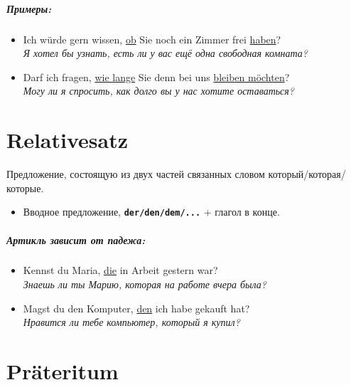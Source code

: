 \documentclass[12pt,a4paper]{report}
\newcommand{\term}[1]{\texttt{\textbf{#1}}}
\newcommand{\satzew}[1]{\underline{#1}}
\newcommand{\ubersatze}[1]{\textit{#1}}
\begin{document}
\paragraph{Примеры:}
\begin{itemize}
 \item Ich würde gern wissen, \satzew{ob} Sie noch ein Zimmer frei \satzew{haben}? 
 ~\\ \ubersatze{Я хотел бы узнать, есть ли у вас ещё одна свободная комната?}
 \item Darf ich fragen, \satzew{wie lange} Sie denn bei uns \satzew{bleiben möchten}? 
 ~\\ \ubersatze{Могу ли я спросить, как долго вы у нас хотите оставаться?}
\end{itemize}


\newpage

\chapter{Relativesatz}

Предложение, состоящую из двух частей связанных словом который/которая/которые. 

\begin{itemize}
 \item Вводное предложение, \term{der/den/dem/...} + глагол в конце.
\end{itemize}

\paragraph{Артикль зависит от падежа:}
\begin{itemize}
 \item Kennst du Maria, \satzew{die} in Arbeit gestern war? 
 ~\\ \ubersatze{Знаешь ли ты Марию, которая на работе вчера была?}
 \item Magst du den Komputer, \satzew{den} ich habe gekauft hat? 
 ~\\ \ubersatze{Нравится ли тебе компьютер, который я купил?}
\end{itemize}

\chapter{Präteritum}
\end{document}

